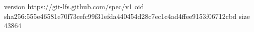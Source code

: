 version https://git-lfs.github.com/spec/v1
oid sha256:555e46581e70f73cefc99f31efda440454d28c7ec1c4ad4ffee9153f06712cbd
size 43864

